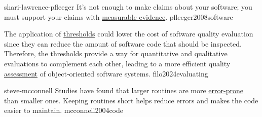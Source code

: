 \documentclass{article}
\begin{document}

\qte
  {shari-lawrence-pfleeger}
  {It's not enough to make claims about your software; you must support your claims with \ul{measurable evidence}.}
  {pfleeger2008software}

  {The application of \ul{thresholds} could lower the cost of software quality evaluation since they can reduce the amount of software code that should be inspected. Therefore, the thresholds provide a way for quantitative and qualitative evaluations to complement each other, leading to a more efficient quality \ul{assessment} of object-oriented software systems.}
  {filo2024evaluating}



\qte
  {steve-mcconnell}
  {Studies have found that larger routines are more \ul{error-prone} than smaller ones. Keeping routines short helps reduce errors and makes the code easier to maintain.}
  {mcconnell2004code}
\end{document}
